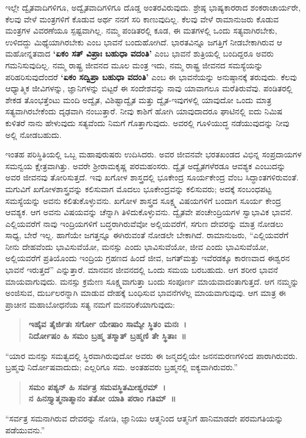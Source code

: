 ಇಲ್ಲೇ ದ್ವೈತವಾದಿಗಳಿಗೂ, ಅದ್ವೈತವಾದಿಗಳಿಗೂ ದೊಡ್ಡ ಅಂತರವಿರುವುದು. ಶ್ರೇಷ್ಠ ಭಾಷ್ಯಕಾರರಾದ ಶಂಕರಾಚಾರ್ಯರೇ, ಕೆಲವು ವೇಳೆ ಮಂತ್ರಗಳಿಗೆ ಕೊಡುವ ಅರ್ಥ ನನಗೆ ಸರಿ ಕಾಣುವುದಿಲ್ಲ. ಕೆಲವು ವೇಳೆ ರಾಮಾನುಜರು ಕೊಡುವ ಮಂತ್ರಗಳ ವಿವರಣೆಯೂ ಸ್ಪಷ್ಟವಾಗಿಲ್ಲ. ನಮ್ಮ ಪಂಡಿತರಲ್ಲಿ ಕೂಡ, ಈ ಮತಗಳಲ್ಲಿ ಒಂದು ಸತ್ಯವಾಗಿರಬೇಕು, ಉಳಿದದ್ದು ಮಿಥ್ಯೆಯಾಗಿರಬೇಕು ಎಂಬ ಭಾವನೆ ಬಂದುಹೋಗಿದೆ. ಭಾರತವಿನ್ನೂ ಜಗತ್ತಿಗೆ ನೀಡಬೇಕಾಗಿರುವ ಆ ಮಹೋನ್ನತವಾದ \textbf{‘ಏಕಂ ಸತ್​ ವಿಪ್ರಾಃ ಬಹುಧಾ ವದಂತಿ’} ಎಂಬ ಭಾವನೆ ಶುತ್ರಿಯಲ್ಲಿ ಬಂದಿದ್ದರೂ ಅವರು ಗಮನಿಸುವುದಿಲ್ಲ. ನಮ್ಮ ರಾಷ್ಟ್ರ ಜೀವನದ ಮೂಲ ಮಂತ್ರ ಇದು, ನಮ್ಮ ರಾಷ್ಟ್ರ ಜೀವನದ ಸಮಸ್ಯೆಯನ್ನು ಪರಿಹರಿಸುವುದೆಂದರೆ \textbf{‘ಏಕಂ ಸದ್ವಿಪ್ರಾ ಬಹುಧಾ ವದಂತಿ’} ಎಂಬ ಈ ಭಾವನೆಯನ್ನು ಅನುಷ್ಠಾನಕ್ಕೆ ತರುವುದು. ಕೆಲವು ಆಧ್ಯಾತ್ಮಿಕ ಜೀವಿಗಳನ್ನು, ಜ್ಞಾನಿಗಳನ್ನು ಬಿಟ್ಟರೆ ಈ ಸಂದೇಶವನ್ನು ನಾವು ಯಾವಾಗಲೂ ಮರೆತಿರುವೆವು. ಪಂಡಿತರಲ್ಲಿ ಶೇಕಡ ತೊಂಭತ್ತೆಂಟು ಮಂದಿ ಅದ್ವೈತ, ವಿಶಿಷ್ಟಾದ್ವೈತ ಮತ್ತು ದ್ವೈತ-ಇವುಗಳಲ್ಲಿ ಯಾವುದೋ ಒಂದು ಮಾತ್ರ ಸತ್ಯವಾಗಿರಬೇಕೆಂದು ದೃಢವಾಗಿ ನಂಬುತ್ತಾರೆ. ನೀವು ಕಾಶಿಗೆ ಹೋಗಿ ಯಾವುದಾದರೂ ಘಾಟಿನಲ್ಲಿ ಐದು ನಿಮಿಷ ಕುಳಿತರೆ ನಾನು ಹೇಳುವುದು ಸತ್ಯವೆಂದು ನಿಮಗೆ ಗೊತ್ತಾಗುವುದು. ಅವರಲ್ಲಿ ಗೂಳಿಯುದ್ಧ ನಡೆಯುವುದನ್ನು ನೀವು ಅಲ್ಲಿ ನೋಡಬಹುದು.

ಇಂತಹ ಪರಿಸ್ಥಿತಿಯಲ್ಲಿ ಒಬ್ಬ ಮಹಾಪುರುಷರು ಉದಿಸಿದರು. ಅವರ ಜೀವನವೇ ಭರತಖಂಡದ ವಿಭಿನ್ನ ಸಂಪ್ರದಾಯಗಳ ಸಮನ್ವಯ ಕ್ಷೇತ್ರವಾಗಿತ್ತು. ಅವರೇ ಶ‍್ರೀರಾಮಕೃಷ್ಣ ಪರಮಹಂಸರು. ದ್ವೈತ ಅದ್ವೈತಗಳೆರಡೂ ಆವಶ್ಯಕ ಎಂಬುದನ್ನು ಅವರ ಜೀವನವು ತೋರಿಸುತ್ತದೆ. ಇವು ಖಗೋಳ ಶಾಸ್ತ್ರದಲ್ಲಿ ಭೂಕೇಂದ್ರ  ಸೂರ್ಯಕೇಂದ್ರ  ವೆಂಬ ಸಿದ್ಧಾಂತಗಳಿರುವಂತೆ. ಮಗುವಿಗೆ ಖಗೋಳಶಾಸ್ತ್ರವನ್ನು ಕಲಿಸುವಾಗ ಮೊದಲು ಭೂಕೇಂದ್ರವನ್ನು ಕಲಿಸುವರು; ಅದಕ್ಕೆ ಸಂಬಂಧಪಟ್ಟ ಸಮಸ್ಯೆಯನ್ನು ಅವನು ಕಲಿತುಕೊಳ್ಳುವನು. ಖಗೋಳ ಶಾಸ್ತ್ರದ ಸೂಕ್ಷ್ಮ ವಿಷಯಗಳಿಗೆ ಬಂದಾಗ ಸೂರ್ಯ ಕೇಂದ್ರ ಆವಶ್ಯಕ. ಆಗ ಅವನು ವಿಷಯವನ್ನು ಚೆನ್ನಾಗಿ ತಿಳಿದುಕೊಳ್ಳುವನು. ದ್ವೈತವೇ ಪಂಚೇಂದ್ರಿಯಗಳ ಸ್ವಾಭಾವಿಕ ಭಾವನೆ. ಎಲ್ಲಿಯವರೆಗೆ ನಾವು ಇಂದ್ರಿಯಗಳಿಗೆ ಬದ್ಧರಾಗಿರುವೆವೋ ಅಲ್ಲಿಯವರೆಗೆ, ಸಗುಣ ದೇವರನ್ನು ಮಾತ್ರ ನೋಡಲು ಸಾಧ್ಯ, ಬೇರೆ ಇಲ್ಲ. ಹಾಗೆಯೇ ಜಗತ್ತನ್ನೂ ಈಗಿರುವಂತೆ ನೋಡಲೇ ಬೇಕಾಗಿದೆ. ರಾಮಾನುಜರು, “ಎಲ್ಲಿಯವರೆಗೆ ನೀನು ದೇಹವೆಂದು ಭಾವಿಸುವೆಯೋ, ಮನಸ್ಸು ಎಂದು ಭಾವಿಸುವೆಯೋ, ಜೀವ ಎಂದು ಭಾವಿಸುವೆಯೋ, ಅಲ್ಲಿಯವರೆಗೆ ಪ್ರತಿಯೊಂದು ಇಂದ್ರಿಯ ಗ್ರಹಣದ ಹಿಂದೆ ಜೀವ, ಜಗತ್​ ಮತ್ತು ಇವೆರಡಕ್ಕೂ ಕಾರಣವಾದ ಈಶ್ವರನ ಭಾವನೆ ಇರುತ್ತದೆ” ಎನ್ನುತ್ತಾರೆ. ಮಾನವನ ಜೀವನದಲ್ಲಿ ಒಂದು ಸಮಯ ಬರಬಹುದು. ಆಗ ಶರೀರ ಭಾವನೆ ಮಾಯವಾಗುವುದು. ಮನಸ್ಸು ಕ್ರಮೇಣ ಸೂಕ್ಷ್ಮವಾಗುತ್ತಾ ಬಂದು ಸಂಪೂರ್ಣ ಮಾಯವಾದಂತಾಗುತ್ತದೆ. ಆಗ ನಮ್ಮನ್ನು ಅಂಜಿಸುವ, ದುರ್ಬಲರನ್ನಾಗಿ ಮಾಡುವ ದೇಹಕ್ಕೆ ಬಂಧಿಸುವ ಭಾವನೆಗಳೆಲ್ಲ ಮಾಯವಾಗುವುವು. ಆಗ ಮಾತ್ರ ಈ ಪ್ರಾಚೀನ ಮಹಾಬೋಧನೆಯ ಸತ್ಯ ನಮಗೆ ಮನವರಿಕೆಯಾಗುವುದು:

\begin{verse}
\textbf{ಇಹೈವ ತೈರ್ಜಿತಃ ಸರ್ಗೋ ಯೇಷಾಂ ಸಾಮ್ಯೇ ಸ್ಥಿತಂ ಮನಃ~।}\\\textbf{ನಿರ್ದೋಷಂ ಹಿ ಸಮಂ ಬ್ರಹ್ಮ ತಸ್ಮಾತ್​ ಬ್ರಹ್ಮಣಿ ತೇ ಸ್ಥಿತಾಃ~॥}
\end{verse}

“ಯಾರ ಮನಸ್ಸು ಸಮತ್ವದಲ್ಲಿ ಸ್ಥಿರವಾಗಿರುವುದೋ ಅವರು ಈ ಜನ್ಮದಲ್ಲಿಯೇ ಜನನಮರಣಗಳಿಂದ ಪಾರಾಗಿರುವರು. ಬ್ರಹ್ಮವು ನಿರ್ದೋಷವಾದುದು; ಎಲ್ಲರಿಗೂ ಸಮ. ಅಂತಹವರು ಬ್ರಹ್ಮನಲ್ಲಿ ಐಕ್ಯವಾಗಿರುವರು.”

\begin{verse}
\textbf{ಸಮಂ ಪಶ್ಯನ್​ ಹಿ ಸರ್ವತ್ರ ಸಮವಸ್ಥಿತಮೀಶ್ವರಮ್​~।}\\\textbf{ನ ಹಿನಸ್ತ್ಯಾತ್ಮನಾತ್ಮಾನಂ ತತೋ ಯಾತಿ ಪರಾಂ ಗತಿಮ್​~॥}
\end{verse}

“ಸರ್ವತ್ರ ಸಮನಾಗಿರುವ ದೇವರನ್ನು ನೋಡಿ, ಜ್ಞಾನಿಯು ಆತ್ಮನಿಂದ ಆತ್ಮನಿಗೆ ಹಾನಿಮಾಡದೇ ಪರಮಗತಿಯನ್ನು ಪಡೆಯುವನು.”

